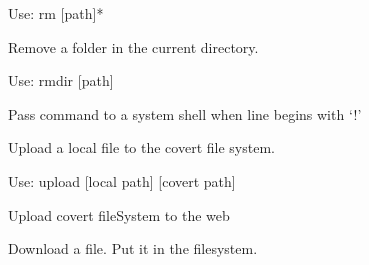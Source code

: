 \documentclass[letterpaper,10pt,english]{sphinxmanual}
\begin{document}
\begin{fulllineitems}
\begin{fulllineitems}
Use: rm {[}path{]}*

\end{fulllineitems}


\begin{fulllineitems}
\label{main:main.Console.do_rmdir}
Remove a folder in the current directory.

Use: rmdir {[}path{]}

\end{fulllineitems}


\begin{fulllineitems}
\label{main:main.Console.do_shell}
Pass command to a system shell when line begins with `!'

\end{fulllineitems}


\begin{fulllineitems}
\label{main:main.Console.do_upload}
Upload a local file to the covert file system.

Use: upload {[}local path{]} {[}covert path{]}

\end{fulllineitems}


\begin{fulllineitems}
\label{main:main.Console.do_uploadfs}
Upload covert fileSystem to the web

\end{fulllineitems}


\begin{fulllineitems}
\label{main:main.Console.down_and_set_file}
Download a file. Put it in the filesystem.

\end{fulllineitems}



\end{fulllineitems}
\end{document}
